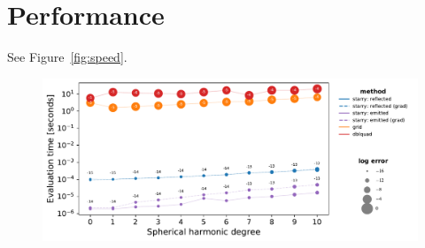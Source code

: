 \documentclass[modern]{aastex62}
\begin{document}
\section{Performance}
\label{sec:performance}
%
 See Figure~\ref{fig:speed}.
%
\begin{figure}[h!]
    \begin{centering}
        \includegraphics[width=\linewidth]{figures/speed.pdf}
    \end{centering}
\end{figure}

\appendix

\end{document}
